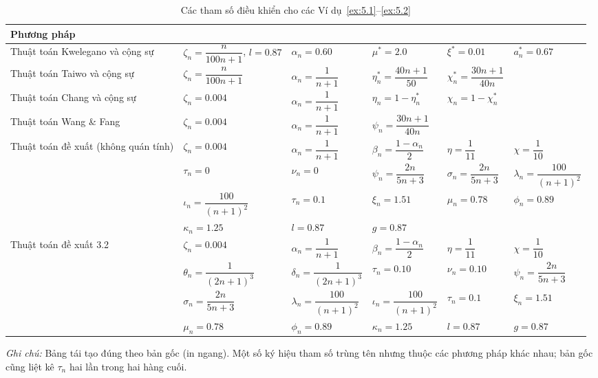 \documentclass[11pt,a4paper]{article}
\theoremstyle{plain}
\theoremstyle{definition}
\theoremstyle{remark}
\numberwithin{equation}{section}
\begin{document}
\begin{table}
\centering
\caption{Các tham số điều khiển cho các Ví dụ~\ref{ex:5.1}--\ref{ex:5.2}}\label{tab:1}
\small
\setlength{\tabcolsep}{8pt}
\renewcommand{\arraystretch}{1.6}
\begin{tabular}{@{}l l l l l l@{}}
\toprule
\textbf{Phương pháp} & & & & & \\
\midrule
Thuật toán Kwelegano và cộng sự &
$\zeta_n=\dfrac{n}{100n+1}$, $l=0.87$ & $\alpha_n=0.60$ & $\mu^{*}=2.0$ & $\xi^{*}=0.01$ & $a_n^{*}=0.67$ \\
Thuật toán Taiwo và cộng sự &
$\zeta_n=\dfrac{n}{100n+1}$ & $\alpha_n=\dfrac{1}{n+1}$ & $\eta_n^{*}=\dfrac{40n+1}{50}$ & $\chi_n^{*}=\dfrac{30n+1}{40n}$ & \\
Thuật toán Chang và cộng sự &
$\zeta_n=0.004$ & $\alpha_n=\dfrac{1}{n+1}$ & $\eta_n=1-\eta_n^{*}$ & $\chi_n=1-\chi_n^{*}$ & \\
Thuật toán Wang \& Fang &
$\zeta_n=0.004$ & $\alpha_n=\dfrac{1}{n+1}$ & $\psi_n=\dfrac{30n+1}{40n}$ & & \\
Thuật toán đề xuất (không quán tính) &
$\zeta_n=0.004$ & $\alpha_n=\dfrac{1}{n+1}$ & $\beta_n=\dfrac{1-\alpha_n}{2}$ & $\eta=\dfrac{1}{11}$ & $\chi=\dfrac{1}{10}$ \\
& $\tau_n=0$ & $\nu_n=0$ & $\psi_n=\dfrac{2n}{5n+3}$ & $\sigma_n=\dfrac{2n}{5n+3}$ & $\lambda_n=\dfrac{100}{(n+1)^2}$ \\
& $\iota_n=\dfrac{100}{(n+1)^2}$ & $\tau_n=0.1$ & $\xi_n=1.51$ & $\mu_n=0.78$ & $\phi_n=0.89$ \\
& $\kappa_n=1.25$ & $l=0.87$ & $g=0.87$ & & \\
Thuật toán đề xuất 3.2 &
$\zeta_n=0.004$ & $\alpha_n=\dfrac{1}{n+1}$ & $\beta_n=\dfrac{1-\alpha_n}{2}$ & $\eta=\dfrac{1}{11}$ & $\chi=\dfrac{1}{10}$ \\
& $\theta_n=\dfrac{1}{(2n+1)^3}$ & $\delta_n=\dfrac{1}{(2n+1)^3}$ & $\tau_n=0.10$ & $\nu_n=0.10$ & $\psi_n=\dfrac{2n}{5n+3}$ \\
& $\sigma_n=\dfrac{2n}{5n+3}$ & $\lambda_n=\dfrac{100}{(n+1)^2}$ & $\iota_n=\dfrac{100}{(n+1)^2}$ & $\tau_n=0.1$ & $\xi_n=1.51$ \\
& $\mu_n=0.78$ & $\phi_n=0.89$ & $\kappa_n=1.25$ & $l=0.87$ & $g=0.87$ \\
\bottomrule
\end{tabular}

\smallskip
\footnotesize\textit{Ghi chú:} Bảng tái tạo đúng theo bản gốc (in ngang). Một số ký hiệu tham số trùng tên nhưng thuộc các phương pháp khác nhau; bản gốc cũng liệt kê $\tau_n$ hai lần trong hai hàng cuối.
\end{table}
\end{document}
